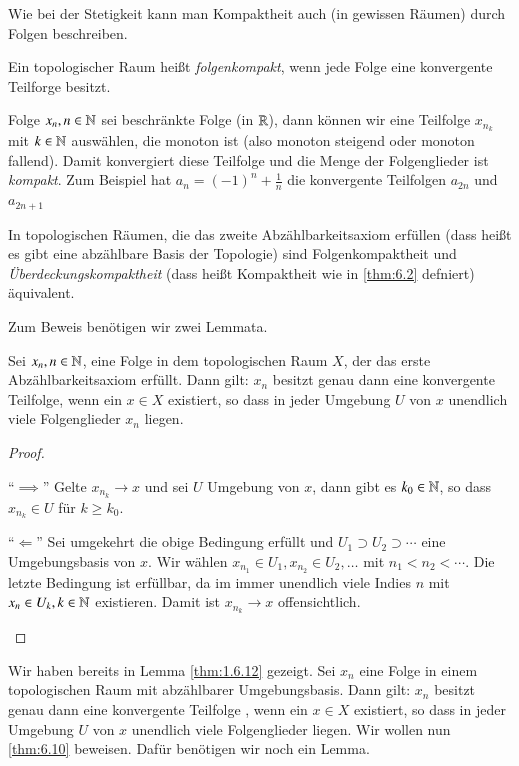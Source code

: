 \documentclass[a4paper,10pt]{scrartcl}
\begin{document}
Wie bei der Stetigkeit kann man Kompaktheit auch (in gewissen Räumen) durch Folgen beschreiben.
\begin{df}\label{thm:6.9}
 Ein topologischer Raum heißt \emph{folgenkompakt}, wenn jede Folge eine konvergente Teilforge besitzt.  
\end{df}
\begin{ex*}
 Folge $x_n, n\in \mathbb{N}$ sei beschränkte Folge (in $ \mathbb{R} $), dann können wir eine Teilfolge $x_{n_k}$ mit $k \in \mathbb{N}$ auswählen, die monoton ist (also monoton steigend oder monoton fallend). Damit konvergiert diese Teilfolge und die Menge der Folgenglieder ist \emph{kompakt}. Zum Beispiel hat $a_n=(-1)^n+\frac 1 n$ die konvergente Teilfolgen $a_{2n}$ und $a_{2n+1}$
\end{ex*}
\begin{st}\label{thm:6.10}
 In topologischen Räumen, die das zweite Abzählbarkeitsaxiom erfüllen (dass heißt es gibt eine abzählbare Basis der Topologie) sind Folgenkompaktheit und \emph{Überdeckungskompaktheit} (dass heißt Kompaktheit wie in \ref{thm:6.2} defniert) äquivalent.
\end{st}
Zum Beweis benötigen wir zwei Lemmata.
\begin{lem}\label{thm:1.6.12}
 Sei $x_n, n\in \mathbb{N}$, eine Folge in dem topologischen Raum $X$, der das erste Abzählbarkeitsaxiom erfüllt.  Dann gilt: $x_n$ besitzt genau dann eine konvergente Teilfolge, wenn ein $x\in X$ existiert, so dass in jeder Umgebung $U$ von $x$ unendlich viele Folgenglieder $x_n$ liegen.
\end{lem}
\begin{proof}
 \begin{seg}{"`$\implies$"'}
  Gelte $x_{n_k}\to x$ und sei $U$ Umgebung von $x$, dann gibt es $k_0\in \mathbb{N}$, so dass $x_{n_k}\in U$ für $k\ge k_0$.
 \end{seg}
\begin{seg}{"`$\Longleftarrow$"'}
 Sei umgekehrt die obige Bedingung erfüllt und $U_1\supset U_2 \supset \dotsb$ eine Umgebungsbasis von $x$. Wir wählen
$x_{n_1}\in U_1, x_{n_2}\in U_2, \dotsc$ mit $n_1<n_2<\dotsb$. Die letzte Bedingung ist erfüllbar, da im immer unendlich viele Indies $n$ mit $x_n\in U_k, k \in \mathbb{N}$ existieren. Damit ist $x_{n_k}\to x$ offensichtlich.
\end{seg}
\end{proof}
 Wir haben bereits in Lemma \ref{thm:1.6.12} gezeigt. Sei $x_n$ eine Folge in einem topologischen Raum  mit abzählbarer Umgebungsbasis. Dann gilt: $x_n$ besitzt genau dann eine konvergente Teilfolge , wenn ein $x\in X$ existiert, so dass in jeder Umgebung $U$ von $x$ unendlich viele Folgenglieder liegen. Wir wollen nun \ref{thm:6.10} beweisen. Dafür benötigen wir noch ein Lemma.
\end{document}
